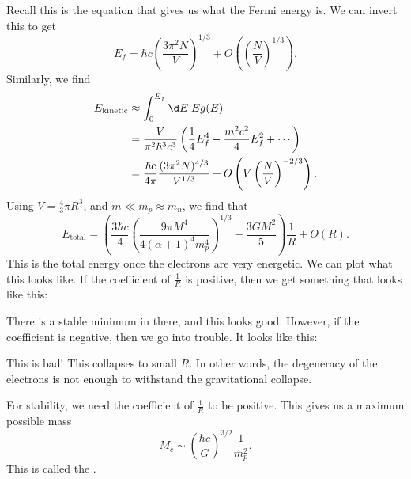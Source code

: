 \documentclass[a4paper]{article}
\begin{document}
Recall this is the equation that gives us what the Fermi energy is. We can invert this to get
\[
  E_f = \hbar c \left(\frac{3 \pi^2 N}{V}\right)^{1/3} + O\left(\left(\frac{N}{V}\right)^{1/3}\right).
\]
Similarly, we find
\begin{align*}
  E_{\mathrm{kinetic}} &\approx \int_0^{E_f}\d E\; E g(E) \\
  &= \frac{V}{\pi^2 \hbar^3 c^3} \left(\frac{1}{4} E_f^4 - \frac{m^2 c^2}{4} E_f^2 + \cdots\right) \\
  &= \frac{\hbar c}{4\pi}\frac{(3\pi^2 N)^{4/3}}{V^{1/3}} + O\left( V \left(\frac{N}{V}\right)^{-2/3}\right).
\end{align*}
Using $V = \frac{4}{3} \pi R^3$, and $m \ll m_p \approx m_n$, we find that %
\[
  E_{\mathrm{total}} = \left(\frac{3\hbar c}{4} \left(\frac{9 \pi M^4}{4(\alpha + 1)^4 m_p^4}\right)^{1/3} - \frac{3GM^2}{5}\right) \frac{1}{R} + O(R).
\]
This is the total energy once the electrons are very energetic. We can plot what this looks like. If the coefficient of $\frac{1}{R}$ is positive, then we get something that looks like this:
\begin{center}
\end{center}
There is a stable minimum in there, and this looks good. However, if the coefficient is negative, then we go into trouble. It looks like this:
\begin{center}
\end{center}
This is bad! This collapses to small $R$. In other words, the degeneracy of the electrons is not enough to withstand the gravitational collapse.

For stability, we need the coefficient of $\frac{1}{R}$ to be positive. This gives us a maximum possible mass
\[
  M_c \sim \left(\frac{\hbar c}{G}\right)^{3/2} \frac{1}{m_p^2}.
\]
This is called the .
\end{document}
